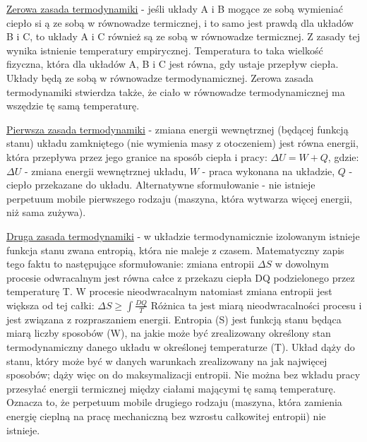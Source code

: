 \underline{Zerowa zasada termodynamiki} - jeśli układy A i B mogące ze sobą wymieniać ciepło si ą ze sobą w równowadze termicznej, i to samo jest prawdą dla układów B i C, to układy A i C również są ze sobą w równowadze termicznej. Z zasady tej wynika istnienie temperatury empirycznej. Temperatura to taka wielkość fizyczna, która dla układów A, B i C jest równa, gdy ustaje przepływ ciepła. Układy będą ze sobą w równowadze termodynamicznej. Zerowa zasada termodynamiki stwierdza także, że ciało w równowadze termodynamicznej ma wszędzie tę samą temperaturę.

\underline{Pierwsza zasada termodynamiki} - zmiana energii wewnętrznej (będącej funkcją stanu) układu zamkniętego (nie wymienia masy z otoczeniem) jest równa energii, która przepływa przez jego granice na sposób ciepła i pracy:\newline
$ \Delta U = W + Q $, gdzie:\newline
$ \Delta U $ - zmiana energii wewnętrznej układu,\newline
$ W $ - praca wykonana na układzie,\newline
$ Q $ - ciepło przekazane do układu.\newline
Alternatywne sformułowanie - nie istnieje perpetuum mobile pierwszego rodzaju (maszyna, która wytwarza więcej energii, niż sama zużywa).

\underline{Druga zasada termodynamiki} - w układzie termodynamicznie izolowanym istnieje funkcja stanu zwana entropią, która nie maleje z czasem. Matematyczny zapis tego faktu to następujące sformułowanie: zmiana entropii $ \Delta S $ w dowolnym procesie odwracalnym jest równa całce z przekazu ciepła DQ podzielonego przez temperaturę T. W procesie nieodwracalnym natomiast zmiana entropii jest większa od tej całki:
$ \Delta S \geq \int \frac{DQ}{T} $\newline
Różnica ta jest miarą nieodwracalności procesu i jest związana z rozpraszaniem energii. Entropia (S) jest funkcją stanu będąca miarą liczby sposobów (W), na jakie może być zrealizowany określony stan termodynamiczny danego układu w określonej temperaturze (T). Układ dąży do stanu, który może być w danych warunkach zrealizowany na jak najwięcej sposobów; dąży więc on do maksymalizacji entropii. Nie można bez wkładu pracy przesyłać energii termicznej między ciałami mającymi tę samą temperaturę. Oznacza to, że perpetuum mobile drugiego rodzaju (maszyna, która zamienia energię cieplną na pracę mechaniczną bez wzrostu całkowitej entropii) nie istnieje. 


